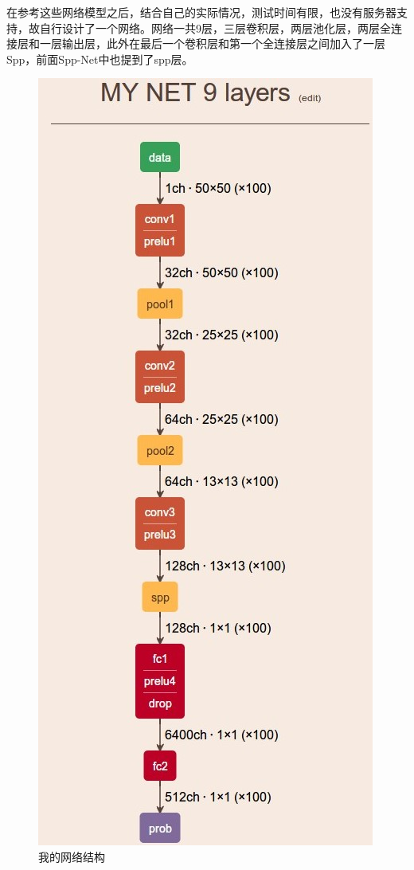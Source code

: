 \documentclass[12pt]{article}
\begin{document}
在参考这些网络模型之后，结合自己的实际情况，测试时间有限，也没有服务器支持，故自行设计了一个网络。网络一共9层，三层卷积层，两层池化层，两层全连接层和一层输出层，此外在最后一个卷积层和第一个全连接层之间加入了一层Spp，前面Spp-Net中也提到了spp层。
\begin{figure}[hp]
    \centering
    \includegraphics[scale=0.6]{mynet.jpg}
    \caption{我的网络结构}
    \label{fig:label}
\end{figure}
\end{document}
